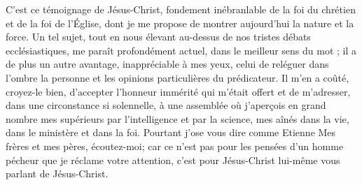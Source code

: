 C’est ce témoignage de Jésus-Christ, fondement inébranlable de la foi du chrétien et de la foi de l’Église, dont je me propose de montrer aujourd’hui la nature et la force. Un tel sujet, tout en nous élevant au-dessus de nos tristes débats ecclésiastiques, me paraît profondément actuel, dans le meilleur sens du mot ; il a de plus un autre avantage, inappréciable à mes yeux, celui de reléguer dans l’ombre la personne et les opinions particulières du prédicateur. Il m’en a coûté, croyez-le bien, d’accepter l’honneur immérité qui m’était offert et de m’adresser, dans une circonstance si solennelle, à une assemblée où j’aperçois en grand nombre mes supérieurs par l’intelligence et par la science, mes aînés dans la vie, dans le ministère et dans la foi. Pourtant j’ose vous dire comme Etienne\frcolon{} \Og{} Mes frères et mes pères, écoutez-moi\Fg{}; car ce n’est pas pour les pensées d’un homme pécheur que je réclame votre attention, c’est pour Jésus-Christ lui-même vous parlant de Jésus-Christ.


